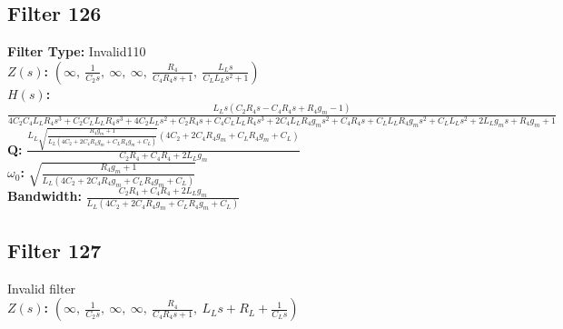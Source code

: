 \documentclass{article}
\begin{document}
\subsection*{Filter 126}
\textbf{Filter Type:} Invalid110 \\ 
\textbf{$Z(s)$:} $\left( \infty, \  \frac{1}{C_{2} s}, \  \infty, \  \infty, \  \frac{R_{4}}{C_{4} R_{4} s + 1}, \  \frac{L_{L} s}{C_{L} L_{L} s^{2} + 1}\right)$ \\ 
\textbf{$H(s)$:} $\frac{L_{L} s \left(C_{2} R_{4} s - C_{4} R_{4} s + R_{4} g_{m} - 1\right)}{4 C_{2} C_{4} L_{L} R_{4} s^{3} + C_{2} C_{L} L_{L} R_{4} s^{3} + 4 C_{2} L_{L} s^{2} + C_{2} R_{4} s + C_{4} C_{L} L_{L} R_{4} s^{3} + 2 C_{4} L_{L} R_{4} g_{m} s^{2} + C_{4} R_{4} s + C_{L} L_{L} R_{4} g_{m} s^{2} + C_{L} L_{L} s^{2} + 2 L_{L} g_{m} s + R_{4} g_{m} + 1}$ \\ 
\textbf{Q:} $\frac{L_{L} \sqrt{\frac{R_{4} g_{m} + 1}{L_{L} \left(4 C_{2} + 2 C_{4} R_{4} g_{m} + C_{L} R_{4} g_{m} + C_{L}\right)}} \left(4 C_{2} + 2 C_{4} R_{4} g_{m} + C_{L} R_{4} g_{m} + C_{L}\right)}{C_{2} R_{4} + C_{4} R_{4} + 2 L_{L} g_{m}}$ \\ 
\textbf{$\omega_0$:} $\sqrt{\frac{R_{4} g_{m} + 1}{L_{L} \left(4 C_{2} + 2 C_{4} R_{4} g_{m} + C_{L} R_{4} g_{m} + C_{L}\right)}}$ \\ 
\textbf{Bandwidth:} $\frac{C_{2} R_{4} + C_{4} R_{4} + 2 L_{L} g_{m}}{L_{L} \left(4 C_{2} + 2 C_{4} R_{4} g_{m} + C_{L} R_{4} g_{m} + C_{L}\right)}$ \\ 
\subsection*{Filter 127}
Invalid filter \\ 
\textbf{$Z(s)$:} $\left( \infty, \  \frac{1}{C_{2} s}, \  \infty, \  \infty, \  \frac{R_{4}}{C_{4} R_{4} s + 1}, \  L_{L} s + R_{L} + \frac{1}{C_{L} s}\right)$ \\ 
\end{document}
